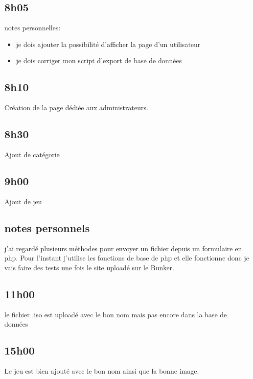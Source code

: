 \documentclass[a4paper,12pt,french]{sphinxmanual}
\begin{document}
\subsection{8h05}
\label{\detokenize{logbook:id27}}
\sphinxAtStartPar
notes personnelles:
\begin{itemize}
\item {} 
\sphinxAtStartPar
je dois ajouter la possibilité d’afficher la page d’un utilisateur

\item {} 
\sphinxAtStartPar
je dois corriger mon script d’export de base de données

\end{itemize}


\subsection{8h10}
\label{\detokenize{logbook:id28}}
\sphinxAtStartPar
Création de la page dédiée aux administrateurs.


\subsection{8h30}
\label{\detokenize{logbook:id29}}
\sphinxAtStartPar
Ajout de catégorie


\subsection{9h00}
\label{\detokenize{logbook:id30}}
\sphinxAtStartPar
Ajout de jeu


\subsection{notes personnels}
\label{\detokenize{logbook:notes-personnels}}
\sphinxAtStartPar
j’ai regardé plusieurs méthodes pour envoyer un fichier depuis un formulaire en php. Pour l’instant j’utilise les fonctions de base de php et elle fonctionne donc je vais faire des tests une fois le site uploadé sur le Bunker.


\subsection{11h00}
\label{\detokenize{logbook:id31}}
\sphinxAtStartPar
le fichier .iso est uploadé avec le bon nom mais pas encore dans la base de données


\subsection{15h00}
\label{\detokenize{logbook:id32}}
\sphinxAtStartPar
Le jeu est bien ajouté avec le bon nom ainsi que la bonne image.
\end{document}

